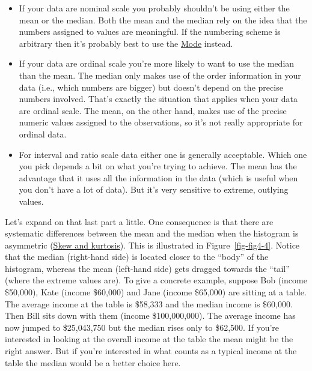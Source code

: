 \documentclass[
  a4paper,
]{book}
\providecommand{\tightlist}{%
  \setlength{\itemsep}{0pt}\setlength{\parskip}{0pt}}\usepackage{longtable,booktabs,array}
\begin{document}
\begin{itemize}
\tightlist
\item
  If your data are nominal scale you probably shouldn't be using either
  the mean or the median. Both the mean and the median rely on the idea
  that the numbers assigned to values are meaningful. If the numbering
  scheme is arbitrary then it's probably best to use the
  \protect\hyperlink{sec-Mode}{Mode} instead.
\item
  If your data are ordinal scale you're more likely to want to use the
  median than the mean. The median only makes use of the order
  information in your data (i.e., which numbers are bigger) but doesn't
  depend on the precise numbers involved. That's exactly the situation
  that applies when your data are ordinal scale. The mean, on the other
  hand, makes use of the precise numeric values assigned to the
  observations, so it's not really appropriate for ordinal data.
\item
  For interval and ratio scale data either one is generally acceptable.
  Which one you pick depends a bit on what you're trying to achieve. The
  mean has the advantage that it uses all the information in the data
  (which is useful when you don't have a lot of data). But it's very
  sensitive to extreme, outlying values.
\end{itemize}

Let's expand on that last part a little. One consequence is that there
are systematic differences between the mean and the median when the
histogram is asymmetric (\protect\hyperlink{skew-and-kurtosis}{Skew and
kurtosis}). This is illustrated in Figure~\ref{fig-fig4-4}. Notice that
the median (right-hand side) is located closer to the ``body'' of the
histogram, whereas the mean (left-hand side) gets dragged towards the
``tail'' (where the extreme values are). To give a concrete example,
suppose Bob (income \$50,000), Kate (income \$60,000) and Jane (income
\$65,000) are sitting at a table. The average income at the table is
\$58,333 and the median income is \$60,000. Then Bill sits down with
them (income \$100,000,000). The average income has now jumped to
\$25,043,750 but the median rises only to \$62,500. If you're interested
in looking at the overall income at the table the mean might be the
right answer. But if you're interested in what counts as a typical
income at the table the median would be a better choice here.
\end{document}
